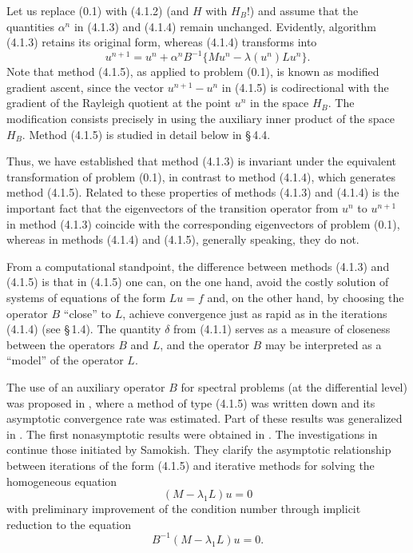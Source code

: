 \documentclass[11pt,oneside]{book}
\begin{document}
Let us replace (0.1) with (4.1.2) (and $H$ with $H_B$!) and assume that the quantities $\alpha^n$ in (4.1.3) and (4.1.4) remain unchanged. Evidently, algorithm (4.1.3) retains its original form, whereas (4.1.4) transforms into
\[
u^{n+1} = u^n + \alpha^n B^{-1} \{ M u^n - \lambda(u^n) L u^n \}. \tag{4.1.5}
\]
Note that method (4.1.5), as applied to problem (0.1), is known as modified gradient ascent, since the vector $u^{n+1} - u^n$ in (4.1.5) is codirectional with the gradient of the Rayleigh quotient at the point $u^n$ in the space $H_B$. The modification consists precisely in using the auxiliary inner product of the space $H_B$. Method (4.1.5) is studied in detail below in \S\,4.4.

Thus, we have established that method (4.1.3) is invariant under the equivalent transformation of problem (0.1), in contrast to method (4.1.4), which generates method (4.1.5). Related to these properties of methods (4.1.3) and (4.1.4) is the important fact that the eigenvectors of the transition operator from $u^n$ to $u^{n+1}$ in method (4.1.3) coincide with the corresponding eigenvectors of problem (0.1), whereas in methods (4.1.4) and (4.1.5), generally speaking, they do not.

From a computational standpoint, the difference between methods (4.1.3) and (4.1.5) is that in (4.1.5) one can, on the one hand, avoid the costly solution of systems of equations of the form $Lu = f$ and, on the other hand, by choosing the operator $B$ ``close'' to $L$, achieve convergence just as rapid as in the iterations (4.1.4) (see \S\,1.4). The quantity $\delta$ from (4.1.1) serves as a measure of closeness between the operators $B$ and $L$, and the operator $B$ may be interpreted as a ``model'' of the operator $L$.

The use of an auxiliary operator $B$ \citep{Kantorovich1948} for spectral problems (at the differential level) was proposed in \citep{Samokish1958}, where a method of type (4.1.5) was written down and its asymptotic convergence rate was estimated. Part of these results was generalized in \citep{Petryshyn1968}. The first nonasymptotic results were obtained in \citep{GodunovOgnevaProkopov1970}. The investigations in \citep{Ruhe1975} continue those initiated by Samokish. They clarify the asymptotic relationship between iterations of the form (4.1.5) and iterative methods for solving the homogeneous equation
\[
(M - \lambda_1 L) u = 0 \tag{4.1.6}
\]
with preliminary improvement of the condition number through implicit reduction to the equation
\[
B^{-1} (M - \lambda_1 L) u = 0. \tag{4.1.7}
\]
\end{document}
